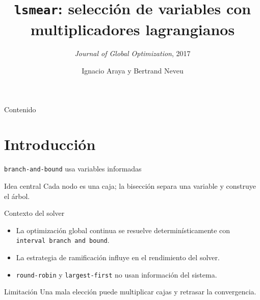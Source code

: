 \documentclass[10pt,aspectratio=169]{beamer}
\title{\texttt{lsmear}: selección de variables con multiplicadores lagrangianos}
\subtitle{\textit{Journal of Global Optimization}, 2017}
\author{Ignacio Araya y Bertrand Neveu}
\date{}
\begin{document}
\begin{frame}[plain]
\titlepage
\end{frame}

\begin{frame}{Contenido}
\tableofcontents
\end{frame}

\section{Introducción}

\begin{frame}{\texttt{branch-and-bound} usa variables informadas}
\small

\begin{block}{Idea central}
Cada nodo es una caja; la bisección separa una variable y construye el árbol.
\end{block}

\begin{exampleblock}{Contexto del solver}
\begin{itemize}
  \item La optimización global continua se resuelve determinísticamente con \texttt{interval branch and bound}.
  \item La estrategia de ramificación influye en el rendimiento del solver.
  \item \texttt{round-robin} y \texttt{largest-first} no usan información del sistema.
\end{itemize}
\end{exampleblock}

\begin{alertblock}{Limitación}
Una mala elección puede multiplicar cajas y retrasar la convergencia.
\end{alertblock}

\end{frame}
\end{document}
